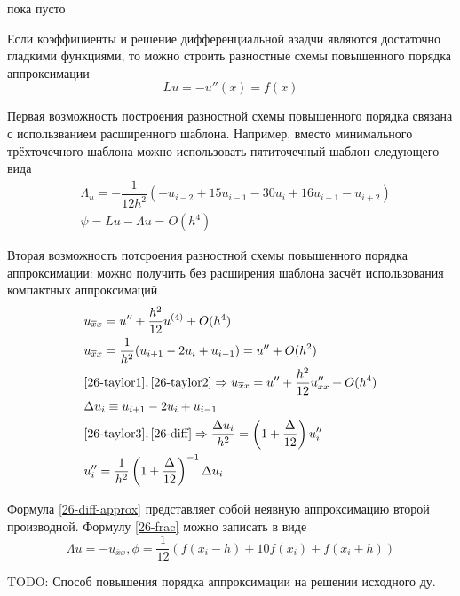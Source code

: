 \begin{col-answer-preambule}
	\begin{plan}
    \item пока пусто
	\end{plan}
\end{col-answer-preambule}


Если коэффициенты и решение дифференциальной азадчи являются достаточно гладкими функциями,
то можно строить разностные схемы повышенного порядка аппроксимации
\begin{equation}
  Lu = -u''(x) = f(x)
\end{equation}

Первая возможность построения разностной схемы повышенного порядка связана с использванием
расширенного шаблона. Например, вместо минимального трёхточечного шаблона можно использовать
пятиточечный шаблон следующего вида
\begin{align}
  &\Lambda_u = -\dfrac{1}{12h^2}\left(-u_{i - 2} + 15u_{i - 1} - 30u_i + 16u_{i + 1}
  - u_{i + 2}\right)\\
  &\psi = Lu - \Lambda u = O(h^4)
\end{align}

Вторая возможность потсроения разностной схемы повышенного порядка аппроксимации: можно
получить без расширения шаблона засчёт использования компактных аппроксимаций
\begin{align}
  \label{26-taylor1}
  &u_{\overline{x}x} = u'' + \dfrac{h^2}{12}u^{(4)} + O(h^4)\\
  \label{26-taylor2}
  &u_{\overline{x}x} = \dfrac{1}{h^2}(u_{i + 1} - 2u_i + u_{i - 1}) = u'' + O(h^2)\\
  \label{26-taylor3}
  &\eqref{26-taylor1}, \eqref{26-taylor2} \Rightarrow
  u_{\overline{x}x} = u'' + \dfrac{h^2}{12}u''_{xx} + O(h^4)\\
  \label{26-diff}
  &\Delta u_i \equiv u_{i + 1} - 2u_i + u_{i - 1}\\
  \label{26-frac}
  &\eqref{26-taylor3}, \eqref{26-diff} \Rightarrow \dfrac{\Delta u_i}{h^2} =
  \left(1 + \dfrac{\Delta}{12}\right)u_i''\\
  \label{26-diff-approx}
  &u_i'' = \dfrac{1}{h^2}\left(1 + \dfrac{\Delta}{12}\right)^{-1}\Delta u_i
\end{align}

Формула \eqref{26-diff-approx} представляет собой неявную аппроксимацию второй
производной. Формулу \eqref{26-frac} можно записать в виде
\begin{equation}
  \Lambda u = -u_{\overline{x}x}, \phi = \dfrac{1}{12}\left(f(x_i - h) +
  10f(x_i) + f(x_i + h)\right)
\end{equation}

TODO: Способ повышения порядка аппроксимации на решении исходного ду.
